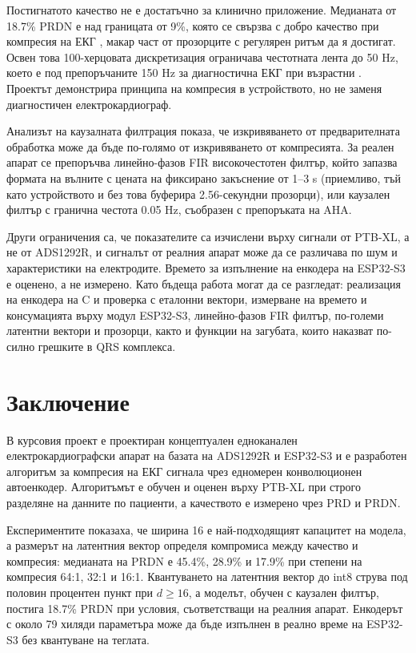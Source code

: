 \documentclass[12pt,a4paper]{article}
\begin{document}
Постигнатото качество не е достатъчно за клинично приложение. Медианата от 18.7\% PRDN е над границата от 9\%, която се свързва с добро качество при компресия на ЕКГ \cite{zigel2000wdd}, макар част от прозорците с регулярен ритъм да я достигат. Освен това 100-херцовата дискретизация ограничава честотната лента до 50 Hz, което е под препоръчаните 150 Hz за диагностична ЕКГ при възрастни \cite{kligfield2007aha}. Проектът демонстрира принципа на компресия в устройството, но не заменя диагностичен електрокардиограф.

Анализът на каузалната филтрация показа, че изкривяването от предварителната обработка може да бъде по-голямо от изкривяването от компресията. За реален апарат се препоръчва линейно-фазов FIR високочестотен филтър, който запазва формата на вълните с цената на фиксирано закъснение от 1--3 s (приемливо, тъй като устройството и без това буферира 2.56-секундни прозорци), или каузален филтър с гранична честота 0.05 Hz, съобразен с препоръката на AHA.

Други ограничения са, че показателите са изчислени върху сигнали от PTB-XL, а не от ADS1292R, и сигналът от реалния апарат може да се различава по шум и характеристики на електродите. Времето за изпълнение на енкодера на ESP32-S3 е оценено, а не измерено. Като бъдеща работа могат да се разгледат: реализация на енкодера на C и проверка с еталонни вектори, измерване на времето и консумацията върху модул ESP32-S3, линейно-фазов FIR филтър, по-големи латентни вектори и прозорци, както и функции на загубата, които наказват по-силно грешките в QRS комплекса.

\section{Заключение}
В курсовия проект е проектиран концептуален едноканален електрокардиографски апарат на базата на ADS1292R и ESP32-S3 и е разработен алгоритъм за компресия на ЕКГ сигнала чрез едномерен конволюционен автоенкодер. Алгоритъмът е обучен и оценен върху PTB-XL при строго разделяне на данните по пациенти, а качеството е измерено чрез PRD и PRDN.

Експериментите показаха, че ширина 16 е най-подходящият капацитет на модела, а размерът на латентния вектор определя компромиса между качество и компресия: медианата на PRDN е 45.4\%, 28.9\% и 17.9\% при степени на компресия 64:1, 32:1 и 16:1. Квантуването на латентния вектор до int8 струва под половин процентен пункт при \(d \ge 16\), а моделът, обучен с каузален филтър, постига 18.7\% PRDN при условия, съответстващи на реалния апарат. Енкодерът с около 79 хиляди параметъра може да бъде изпълнен в реално време на ESP32-S3 без квантуване на теглата.
\end{document}
